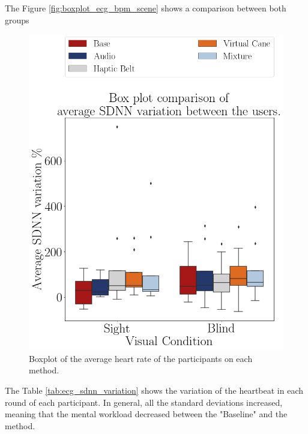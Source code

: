 The Figure \ref{fig:boxplot_ecg_bpm_scene} shows a comparison between both groups

\begin{figure}[!htb]
    \centering
    \includegraphics[width = 0.5\linewidth]{Resultados/ECG/Figuras/png/boxplot_ecg_sdnn_box_scene.png}
    \caption{Boxplot of the average heart rate of the participants on each method.}
    \label{fig:boxplot_ecg_sdnn_box_scene}
\end{figure}

The Table \ref{tab:ecg_sdnn_variation} shows the variation of the heartbeat in each round of each participant. In general, all the standard deviations increased, meaning that the mental workload decreased between the "Baseline" and the method.


